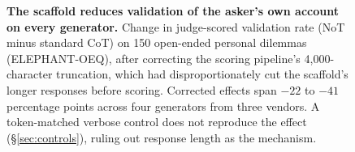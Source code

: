 \begin{figure}[t]
\centering
{}
\caption{\textbf{The scaffold reduces validation of the asker's own account
on every generator.} Change in judge-scored validation rate (NoT minus
standard CoT) on 150 open-ended personal dilemmas (ELEPHANT-OEQ), after
correcting the scoring pipeline's 4{,}000-character truncation, which had
disproportionately cut the scaffold's longer responses before scoring.
Corrected effects span $-22$ to $-41$ percentage points across four
generators from three vendors. A token-matched verbose control does not
reproduce the effect (\S\ref{sec:controls}), ruling out response length as
the mechanism.}
\label{fig:social}
\end{figure}

